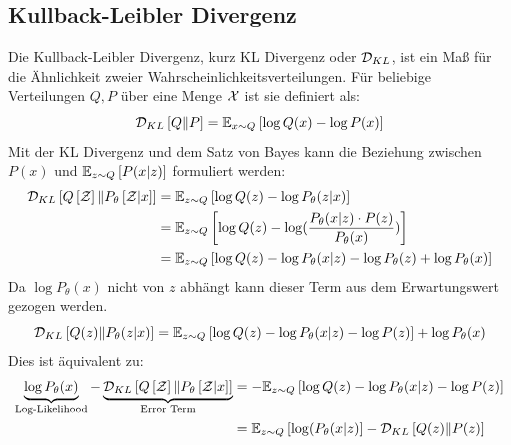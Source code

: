 \subsection{Kullback-Leibler Divergenz}
Die Kullback-Leibler Divergenz, kurz KL Divergenz oder $\mathcal{D}_{KL}$, ist ein Maß für die Ähnlichkeit zweier Wahrscheinlichkeitsverteilungen. Für beliebige Verteilungen $Q, P$ über eine Menge $\mathcal{X}$ ist sie definiert als:
\begin{equation}
  \mathcal{D}_{KL}\left[ Q \| P\right] = \mathbb{E}_{x \sim Q}\left[ \log Q(x) - \log P(x)\right]
\end{equation}
Mit der KL Divergenz und dem Satz von Bayes kann die Beziehung zwischen $P(x)$ und $\mathbb{E}_{z \sim Q}\left[ P(x \vert z )\right]$ formuliert werden:
\begin{align}
  \mathcal{D}_{KL}\left[ Q\left[ \mathcal{Z} \right] \| P_\theta\left[ \mathcal{Z} \vert x\right] \right] &= \mathbb{E}_{z \sim Q}\left[ \log Q(z) - \log P_\theta(z \vert x)\right] \\
  &= \mathbb{E}_{z \sim Q}\left[ \log Q(z) - \log(\frac{P_\theta(x \vert z) \cdot P(z)}{P_\theta(x)})\right] \notag\\
  &= \mathbb{E}_{z \sim Q}\left[ \log Q(z) - \log P_\theta(x \vert z) - \log P_\theta(z) + \log P_\theta(x)\right] \notag
\end{align}
Da $\log P_\theta(x)$ nicht von $z$ abhängt kann dieser Term aus dem Erwartungswert gezogen werden.
\begin{equation}
  \mathcal{D}_{KL}\left[ Q(z) \| P_\theta(z \vert x)\right] = \mathbb{E}_{z \sim Q}\left[ \log Q(z) - \log P_\theta(x \vert z) - \log P(z)\right] + \log P_\theta(x) \notag
\end{equation}
Dies ist äquivalent zu:
\begin{align}
  \underbrace{\log P_\theta(x)}_\text{Log-Likelihood} - \underbrace{\mathcal{D}_{KL}\left[ Q\left[ \mathcal{Z} \right] \| P_\theta\left[ \mathcal{Z} \vert x\right] \right]}_\text{Error Term} &= - \mathbb{E}_{z \sim Q}\left[ \log Q(z) - \log P_\theta(x \vert z) - \log P(z)\right] \notag\\
  &= \mathbb{E}_{z \sim Q}\left[ \log(P_\theta(x \vert z)\right] - \mathcal{D}_{KL}\left[ Q(z) \| P(z)\right] \label{eq:pre_objective}
\end{align}
